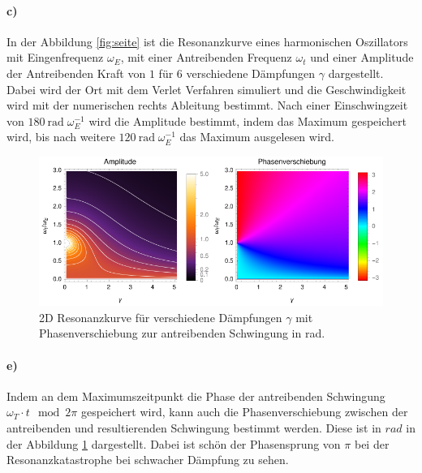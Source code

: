 \paragraph*{c)} In der Abbildung \ref{fig:seite} ist die Resonanzkurve eines harmonischen Oszillators mit Eingenfrequenz $\omega_E$, mit einer Antreibenden Frequenz $\omega_t$ und einer Amplitude der Antreibenden Kraft von $1$ für 6 verschiedene Dämpfungen $\gamma$  dargestellt.\\ 
Dabei wird der Ort mit dem Verlet Verfahren simuliert und die Geschwindigkeit wird mit der numerischen rechts Ableitung bestimmt.
Nach einer Einschwingzeit von $\SI{180}{\radian}\;\omega_E^{-1}$ wird die Amplitude bestimmt, indem das Maximum gespeichert wird, bis nach weitere $\SI{120}{\radian}\;\omega_E^{-1}$ das Maximum ausgelesen wird. 

\smallskip

\begin{figure}[p]
	\centering
	\includegraphics[width=450pt]{C_Plot.pdf}
	\caption{2D Resonanzkurve für verschiedene Dämpfungen $\gamma$ mit Phasenverschiebung zur antreibenden Schwingung in \si{\radian}.}
	\label{fig:plot}
\end{figure}
\paragraph*{e)} Indem an dem Maximumszeitpunkt die Phase der antreibenden Schwingung $\omega_T \cdot t \mod 2\pi$ gespeichert wird, kann auch die Phasenverschiebung zwischen der antreibenden und resultierenden Schwingung bestimmt werden.
Diese ist in $rad$ in der Abbildung \ref{fig:plot} dargestellt.
Dabei ist schön der Phasensprung von $\pi$ bei der Resonanzkatastrophe bei schwacher Dämpfung zu sehen.

